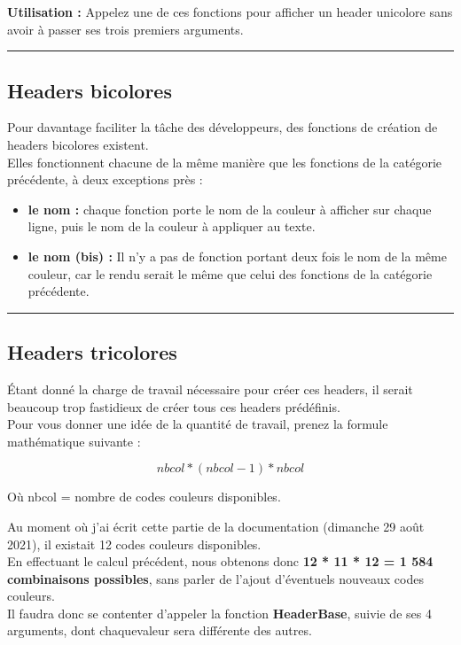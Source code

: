 \documentclass[a4paper,10pt]{article}
\begin{document}
\textbf{Utilisation :}\linebreak
Appelez une de ces fonctions pour afficher un header unicolore sans avoir à passer ses trois premiers arguments.\\[1\baselineskip]


\color{green}\par\noindent\rule{\textwidth}{0.4pt}\color{white}

\color{green}
\subsection{Headers bicolores}\color{white}
Pour davantage faciliter la tâche des développeurs, des fonctions de création de headers bicolores existent.\\[1\baselineskip]

Elles fonctionnent chacune de la même manière que les fonctions de la catégorie précédente, à deux exceptions près :
\begin{itemize}
 \item \textbf{le nom :} chaque fonction porte le nom de la couleur à afficher sur chaque ligne, puis le nom de la couleur à appliquer au texte.\\[1\baselineskip]
 \item \textbf{le nom (bis) :} Il n'y a pas de fonction portant deux fois le nom de la même couleur, car le rendu serait le même que celui des fonctions de la catégorie précédente.\\[1\baselineskip]
\end{itemize}



\color{green}\par\noindent\rule{\textwidth}{0.4pt}\color{white}

\color{green}
\subsection{Headers tricolores}\color{white}
Étant donné la charge de travail nécessaire pour créer ces headers, il serait beaucoup trop fastidieux de créer tous ces headers prédéfinis.\\[1\baselineskip]

Pour vous donner une idée de la quantité de travail, prenez la formule mathématique suivante :

\[nbcol * (nbcol - 1) * nbcol\]

Où nbcol = nombre de codes couleurs disponibles.\linebreak

Au moment où j'ai écrit cette partie de la documentation (dimanche 29 août 2021), il existait 12 codes couleurs disponibles.\\[1\baselineskip]

En effectuant le calcul précédent, nous obtenons donc \textbf{12 * 11 * 12 = 1 584 combinaisons possibles}, sans parler de l'ajout d'éventuels nouveaux codes couleurs.\\[1\baselineskip]

Il faudra donc se contenter d'appeler la fonction \textbf{\color{mauve}HeaderBase\color{white}}, suivie de ses 4 arguments, dont chaque\linebreak valeur sera différente des autres.
\end{document}
